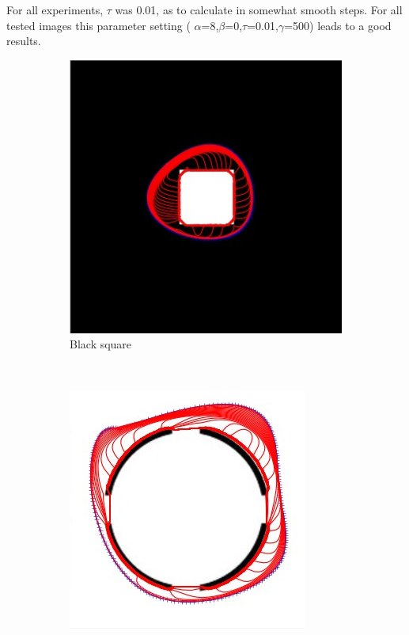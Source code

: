 \documentclass[paper=a4, fontsize=11pt]{scrartcl} %
\numberwithin{equation}{section} %
\numberwithin{figure}{section} %
\numberwithin{table}{section} %
\begin{document}
For all experiments, $\tau$ was 0.01, as to calculate in somewhat smooth steps. For all tested images this parameter setting ( $\alpha$=8,$\beta$=0,$\tau$=0.01,$\gamma$=500) leads to a good results.\\
\begin{figure}[H]
        \centering
        \begin{subfigure}[b]{0.2\textwidth}
                \includegraphics[width=\textwidth]{108}
                \caption{Black square}
                \label{fig:Blacksquare}
        \end{subfigure}%
        ~ %
        \begin{subfigure}[b]{0.2\textwidth}
                \includegraphics[width=\textwidth]{301}

\end{subfigure}
\end{figure}
\end{document}
